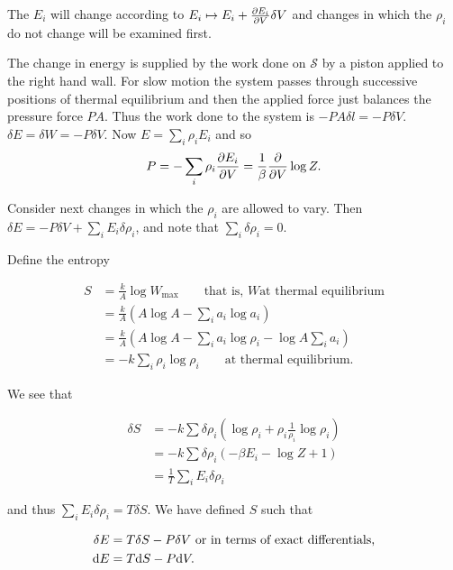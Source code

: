 \documentclass{notes}
\newcommand{\cS}{\mathcal{S}}
\begin{document}
The $E_i$ will change according to $E_i \mapsto E_i
+ \frac{\partial E_i}{\partial V} \delta V$ and changes in which the $\rho_i$ do
not change will be examined first.

The change in energy is supplied by the work done on $\cS$ by a piston
applied to the right hand wall.  For slow motion the system passes
through successive positions of thermal equilibrium and then
the applied force just balances the pressure force $PA$.
Thus the work done to the system is $- P A \delta l = - P \delta V$.
$\delta E = \delta W = - P \delta V$.  Now $E = \sum_i \rho_i E_i$
and so
\begin{equation}\label{eq:pressure}
P = - \sum_i \rho_i \frac{\partial E_i}{\partial V} = \frac{1}{\beta} \frac{\partial }{\partial V} \log Z.
\end{equation}

Consider next changes in which the $\rho_i$ are allowed to vary.
Then $\delta E = -P\delta V + \sum_i E_i \delta \rho_i$,
and note that $\sum_i \delta \rho_i = 0$.

Define the entropy

\begin{equation}\label{eq:entdef}
\begin{split}
S &= \frac{k}{A} \log W_{\text{max}} \qquad \text{that is, $W$
at thermal equilibrium} \\
&= \frac{k}{A} \left( A \log A - \sum_i a_i \log a_i \right) \\
&= \frac{k}{A} \left( A \log A - \sum_i a_i \log \rho_i
- \log A \sum_i a_i \right) \\
&= - k \sum_i \rho_i \log \rho_i \qquad \text{at thermal equilibrium.}
\end{split}
\end{equation}

We see that

\begin{align*}
\delta S &= -k \sum \delta \rho_i\left(\log \rho_i + \rho_i \frac{1}{\rho_i}
\log \rho_i \right) \\
&= - k \sum \delta \rho_i \left( - \beta E_i - \log Z + 1 \right) \\
&= \frac{1}{T} \sum_i E_i \delta \rho_i
\end{align*}

and thus $\sum_i E_i \delta \rho_i = T \delta S$.  We have defined
$S$ such that

\begin{equation}\label{eq:firstlaw1}
\begin{aligned}
\delta E &= T \delta S - P \delta V
\text{ or in terms of exact differentials,} \\
\mathrm{d} E &= T \mathrm{d} S - P \mathrm{d} V.
\end{aligned}
\end{equation}
\end{document}
